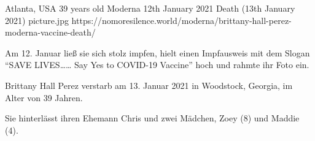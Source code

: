{Atlanta, USA}
{39 years old}
{Moderna}
{12th January 2021}
{Death (13th January 2021)}
{picture.jpg}
{https://nomoresilence.world/moderna/brittany-hall-perez-moderna-vaccine-death/}
{

Am 12. Januar ließ sie sich stolz impfen, hielt einen Impfausweis mit dem Slogan
“SAVE LIVES…… Say Yes to COVID-19 Vaccine” hoch und rahmte ihr Foto ein.

Brittany Hall Perez verstarb am 13. Januar 2021 in Woodstock, Georgia, im Alter
von 39 Jahren.

Sie hinterlässt ihren Ehemann Chris und zwei Mädchen, Zoey (8) und Maddie (4).

}
